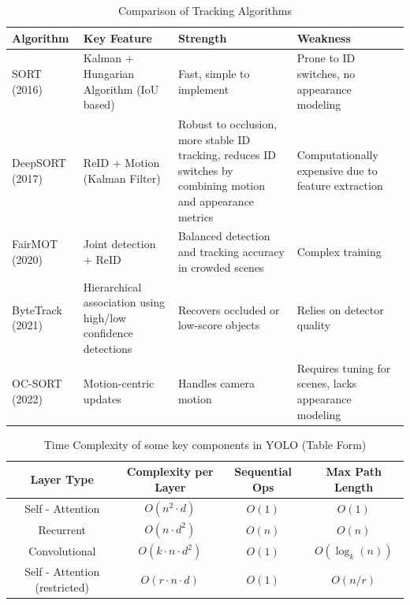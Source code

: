 \documentclass[11pt]{article}
\begin{document}
\begin{table}[h]
    \centering
    \begin{tabular}{|p{1.8cm}|p{3.5cm}|p{4.1cm}|p{4.1cm}|}
        \hline
        \textbf{Algorithm} & \textbf{Key Feature} & \textbf{Strength} & \textbf{Weakness} \\
        \hline
        SORT (2016) & Kalman + Hungarian Algorithm (IoU based) & Fast, simple to implement & Prone to ID switches, no appearance modeling \\
        \hline
        DeepSORT (2017) & ReID + Motion (Kalman Filter) & Robust to occlusion, more stable ID tracking, reduces ID switches by combining motion and appearance metrics & Computationally expensive due to feature extraction \\
        \hline
        FairMOT (2020) & Joint detection + ReID & Balanced detection and tracking accuracy in crowded scenes & Complex training \\
        \hline
        ByteTrack (2021) & Hierarchical association using high/low confidence detections & Recovers occluded or low-score objects & Relies on detector quality \\
        \hline
        OC-SORT (2022) & Motion-centric updates & Handles camera motion & Requires tuning for scenes, lacks appearance modeling \\
        \hline
    \end{tabular}
\label{tab:tracking_algorithms}
\caption{Comparison of Tracking Algorithms}
\end{table}
\begin{table}[h]
    \centering
    \begin{tabular}{|c|c|c|c|}
        \hline
        \textbf{Layer Type} & \textbf{Complexity per Layer} & \textbf{Sequential Ops} & \textbf{Max Path Length} \\
        \hline
        Self - Attention & $O(n^2 \cdot d)$ & $O(1)$ & $O(1)$ \\
        \hline
        Recurrent & $O(n \cdot d^2)$ & $O(n)$ & $O(n)$ \\
        \hline
        Convolutional & $O(k \cdot n \cdot d^2)$ & $O(1)$ & $O(\log_k(n))$ \\
        \hline
        Self - Attention (restricted) & $O(r \cdot n \cdot d)$ & $O(1)$ & $O(n/r)$ \\
        \hline
    \end{tabular}
    \label{tab:time_complexity_table}
    \caption{Time Complexity of some key components in YOLO (Table Form)}
\end{table}
\end{document}

